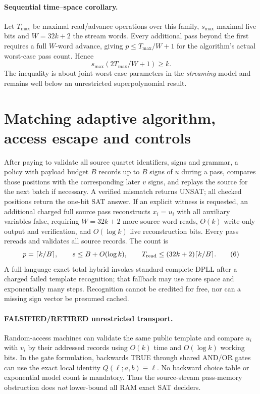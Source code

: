 \documentclass[11pt]{article}
\begin{document}
\paragraph{Sequential time--space corollary.}
Let $T_{\max}$ be maximal read/advance operations over this family, $s_{\max}$ maximal live bits and $W=32k+2$ the stream words. Every additional pass beyond the first requires a full $W$-word advance, giving $p\le T_{\max}/W+1$ for the algorithm's actual worst-case pass count. Hence
\[
\boxed{s_{\max}\left(2T_{\max}/W+1\right)\ge k.}
\tag{5}
\]
The inequality is about joint worst-case parameters in the \emph{streaming} model and remains well below an unrestricted superpolynomial result.

\section{Matching adaptive algorithm, access escape and controls}
After paying to validate all source quartet identifiers, signs and grammar, a policy with payload budget $B$ records up to $B$ signs of $u$ during a pass, compares those positions with the corresponding later $v$ signs, and replays the source for the next batch if necessary. A verified mismatch returns UNSAT; all checked positions return the one-bit SAT answer. If an explicit witness is requested, an additional charged full source pass reconstructs $x_i=u_i$ with all auxiliary variables false, requiring $W=32k+2$ more source-word reads, $O(k)$ write-only output and verification, and $O(\log k)$ live reconstruction bits. Every pass rereads and validates all source records. The count is
\[
p=\lceil k/B\rceil,\qquad s\le B+O(\log k),\qquad
T_{\rm read}\le (32k+2)\lceil k/B\rceil.
\tag{6}
\]
A full-language exact total hybrid invokes standard complete DPLL after a charged failed template recognition; that fallback may use more space and exponentially many steps. Recognition cannot be credited for free, nor can a missing sign vector be presumed cached.

\paragraph{FALSIFIED/RETIRED unrestricted transport.}
Random-access machines can validate the same public template and compare $u_i$ with $v_i$ by their addressed records using $O(k)$ time and $O(\log k)$ working bits. In the gate formulation, backwards TRUE through shared AND/OR gates can use the exact local identity $Q(\ell;a,b)\equiv\ell$. No backward choice table or exponential model count is mandatory. Thus the source-stream pass-memory obstruction does \emph{not} lower-bound all RAM exact SAT deciders.
\end{document}
